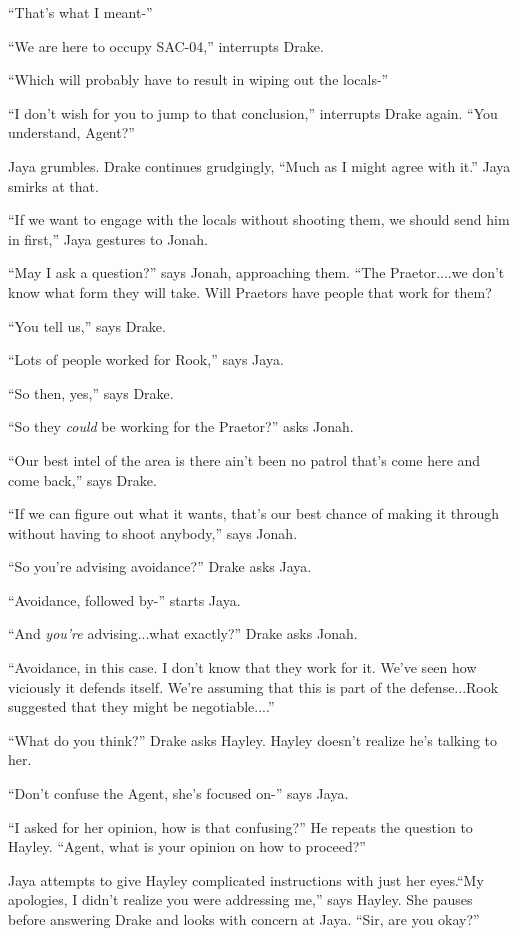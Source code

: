 ``That's what I meant-''

``We are here to occupy SAC-04,'' interrupts Drake.

``Which will probably have to result in wiping out the locals-''

``I don't wish for you to jump to that conclusion,'' interrupts Drake again.  ``You understand, Agent?''

Jaya grumbles.  Drake continues grudgingly, ``Much as I might agree with it.''  Jaya smirks at that.

``If we want to engage with the locals without shooting them, we should send him in first,'' Jaya gestures to Jonah.

``May I ask a question?'' says Jonah, approaching them.  ``The Praetor....we don't know what form they will take.  Will Praetors have people that work for them?

``You tell us,'' says Drake.

``Lots of people worked for Rook,'' says Jaya.

``So then, yes,'' says Drake.

``So they \textit{could} be working for the Praetor?'' asks Jonah.

``Our best intel of the area is there ain't been no patrol that's come here and come back,'' says Drake.

``If we can figure out what it wants, that's our best chance of making it through without having to shoot anybody,'' says Jonah. 

``So you're advising avoidance?'' Drake asks Jaya.

``Avoidance, followed by-'' starts Jaya.

``And \textit{you're} advising...what exactly?'' Drake asks Jonah.

``Avoidance, in this case.  I don't know that they work for it. We've seen how viciously it defends itself.  We're assuming that this is part of the defense...Rook suggested that they might be negotiable....'' 

``What do you think?'' Drake asks Hayley.  Hayley doesn't realize he's talking to her.

``Don't confuse the Agent, she's focused on-'' says Jaya.

``I asked for her opinion, how is that confusing?''  He repeats the question to Hayley.  ``Agent, what is your opinion on how to proceed?''

Jaya attempts to give Hayley complicated instructions with just her eyes.``My apologies, I didn't realize you were addressing me,'' says Hayley.  She pauses before answering Drake and looks with concern at Jaya.  ``Sir, are you okay?''


